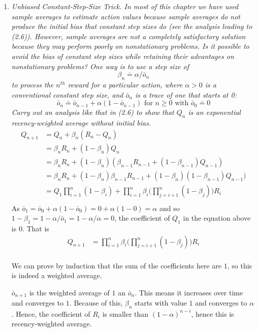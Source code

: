 \documentclass[12pt,a4paper]{article}
\begin{document}
\begin{enumerate}
\item
  \textit{Unbiased Constant-Step-Size Trick. In most of this chapter we have used
  sample averages to estimate action values because sample averages do not produce the
  initial bias that constant step sizes do (see the analysis leading to (2.6)). However, sample
  averages are not a completely satisfactory solution because they may perform poorly
  on nonstationary problems. Is it possible to avoid the bias of constant step sizes while
  retaining their advantages on nonstationary problems? One way is to use a step size of
  \[\beta_n\doteq \alpha / \bar{o}_n\]
  to process the $n^{th}$ reward for a particular action, where $\alpha > 0$ is
  a conventional constant step size, and $\bar{o}_n$ is a trace of one that starts at 0:
  \[\bar{o}_n \doteq \bar{o}_{n - 1} + \alpha(1 - \bar{o}_{n - 1}) \text{ for } n \ge 0 \text{ with } \bar{o}_0 \doteq 0\]
  Carry out an analysis like that in (2.6) to show that $Q_n$ is an exponential recency-weighted
  average without initial bias.
  }
  \begin{align*}
    Q_{n + 1} &= Q_n + \beta_n(R_n - Q_n)\\
    &= \beta_n R_n + (1 - \beta_n)Q_n\\
    &= \beta_n R_n + (1 - \beta_n)(\beta_{n - 1}R_{n - 1} + (1 - \beta_{n - 1}) Q_{n - 1})\\
    &= \beta_n R_n + (1 - \beta_n)\beta_{n - 1}R_{n - 1} + (1 - \beta_n)(1 - \beta_{n - 1}) Q_{n - 1})\\
    &=  Q_1\prod_{i = 1}^n (1 - \beta_i) + \prod_{i = 1} ^n \beta_i \Big(\prod_{j = i + 1}^n (1 - \beta_j)\Big) R_i\\
  \end{align*}
  As $\bar{o}_1 = \bar{o}_0 + \alpha(1 - \bar{o}_0) = 0 + \alpha(1 - 0) = \alpha$ and so
  $1 - \beta_1 = 1 - \alpha/\bar{o}_1 = 1 - \alpha/\alpha = 0$, the coefficient of
  $Q_1$ in the equation above is $0$. That is
    \begin{align*}
    Q_{n + 1} &= \prod_{i = 1} ^n \beta_i \Big(\prod_{j = i + 1}^n (1 - \beta_j)\Big) R_i\\
  \end{align*}

  We can prove by induction that the sum of the coefficients here are $1$, so this is indeed
  a weighted average.

  $\bar{o}_{n + 1}$ is the weighted average of $1$ an $\bar{o}_n.$ This means it increases over time and
  converges to $1$. Because of this, $\beta_n$ starts with value $1$ and converges to $\alpha$.
  Hence, the coefficient of $R_i$ is smaller than $(1 - \alpha)^{n - i}$, hence this is
  recency-weighted average.


\end{enumerate}
\end{document}
